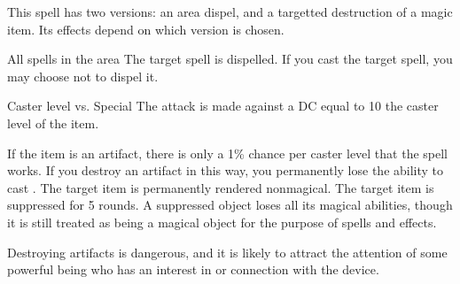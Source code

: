 \begin{spellheader}
    \begin{spelltargetinginfo}
    \end{spelltargetinginfo}
    \begin{spelleffects}
        \spellspecial This spell has two versions: an area dispel, and a targetted destruction of a magic item. Its effects depend on which version is chosen.
        \begin{spelltargetinginfo}
        \end{spelltargetinginfo}
        \begin{spelltargetinginfo}
        \end{spelltargetinginfo}
    \end{spelleffects}
\end{spellheader}
\begin{spellcontent}
    \begin{spellattack}{All spells in the area}
        \spelleffect The target spell is dispelled. If you cast the target spell, you may choose not to dispel it.
    \end{spellattack}
    \begin{spellattack}{Caster level vs. Special}
        \spellspecial The attack is made against a DC equal to 10 \add the caster level of the item.

        If the item is an artifact, there is only a 1\% chance per caster level that the spell works. If you destroy an artifact in this way, you permanently lose the ability to cast \spell.
        \spellsuccess The target item is permanently rendered nonmagical.
        \spellfailure The target item is suppressed for 5 rounds. A suppressed object loses all its magical abilities, though it is still treated as being a magical object for the purpose of spells and effects.
    \end{spellattack}
\end{spellcontent}
\begin{spellfooter}
    \spellnotes Destroying artifacts is dangerous, and it is likely to attract the attention of some powerful being who has an interest in or connection with the device.
\end{spellfooter}

